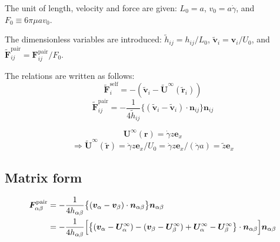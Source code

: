 \documentclass[12pt]{article}
\begin{document}
The unit of length, velocity and force 
are given:
$L_0 = a$,  $v_0 = a \dot{\gamma}$, and $F_0 \equiv 6 \pi \mu a v_0$.

The dimensionless variables are introduced:
$\tilde{h}_{ij} = h_{ij} / L_0$,
$\tilde{\bm{v}}_i = \bm{v}_i / U_0$,
and $\tilde{\bm{F}}_{ij}^{\mathrm{pair}} = \bm{F}_{ij}^{\mathrm{pair}} / F_0$.

The relations are written as follows:
\begin{equation}
 \tilde{\bm{F}}_i^{\mathrm{self}} = 
-( \tilde{\bm{v}}_i - 
\tilde{\bm{U}}^{\infty} 
(\tilde{\bm{r}}_i) )
\end{equation}
\begin{equation}
 \tilde{\bm{F}}_{ij}^{\mathrm{pair}}
= 
- \frac{1}{4 \tilde{h}_{ij}}
\bigl\{
(\tilde{\bm{v}}_i-
\tilde{\bm{v}}_i)\cdot
\bm{n}_{ij}
\bigr\}\bm{n}_{ij}
\end{equation}

\begin{equation}
 \bm{U}^{\infty}(\bm{r})
 = 
 \dot{\gamma} z \bm{e}_{x}
\end{equation}
\begin{equation}
\Longrightarrow
  \tilde{\bm{U}}^{\infty}(\tilde{\bm{r}})
 = 
 \dot{\gamma} z \bm{e}_{x} / U_0
=  \dot{\gamma} z \bm{e}_{x} / (\dot{\gamma} a)
= \tilde{z} \bm{e}_{x} 
\end{equation}


\subsection*{Matrix form}
\begin{align*}
 \bm{F}_{\alpha\beta}^{\mathrm{pair}}
&= 
- \frac{1}{4 h_{\alpha\beta}}
\bigl\{
(\bm{v}_\alpha-
\bm{v}_\beta)\cdot
\bm{n}_{\alpha\beta}
\bigr\}\bm{n}_{\alpha\beta} \\
&=
- \frac{1}{4 h_{\alpha\beta}}
\Bigl[
\bigl\{
(\bm{v}_\alpha- \bm{U}^{\infty}_\alpha)-
(\bm{v}_\beta- \bm{U}^{\infty}_\beta)
+ \bm{U}^{\infty}_\alpha
- \bm{U}^{\infty}_\beta
\bigr\}\cdot
\bm{n}_{\alpha\beta}
\Bigr]
\bm{n}_{\alpha\beta}
\end{align*}
\end{document}
